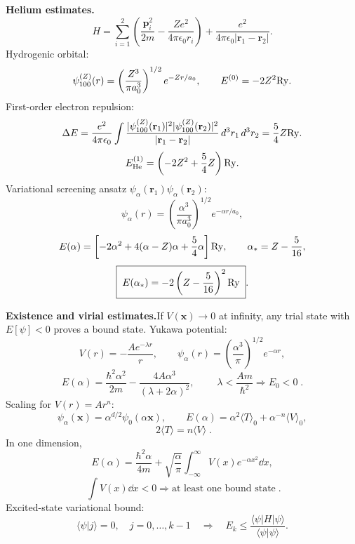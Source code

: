 \noindent\textbf{Helium estimates.}\quad
\[
H=\sum_{i=1}^2\left(\frac{\mathbf p_i^2}{2m}
-\frac{Ze^2}{4\pi\epsilon_0r_i}\right)
+\frac{e^2}{4\pi\epsilon_0|\mathbf r_1-\mathbf r_2|}.
\]
Hydrogenic orbital:
\[
\psi_{100}^{(Z)}(r)=\left(\frac{Z^3}{\pi a_0^3}\right)^{1/2}e^{-Zr/a_0},
\qquad E^{(0)}=-2Z^2{\rm Ry}.
\]
First-order electron repulsion:
\[
\Delta E=\frac{e^2}{4\pi\epsilon_0}
\int\frac{|\psi_{100}^{(Z)}(\mathbf r_1)|^2
|\psi_{100}^{(Z)}(\mathbf r_2)|^2}
{|\mathbf r_1-\mathbf r_2|}\,d^3r_1\,d^3r_2
=\frac54Z{\rm Ry}.
\]
\[
E_{\rm He}^{(1)}=\left(-2Z^2+\frac54Z\right){\rm Ry}.
\]
Variational screening ansatz $\psi_\alpha(\mathbf r_1)\psi_\alpha(\mathbf r_2)$:
\[
\psi_\alpha(r)=\left(\frac{\alpha^3}{\pi a_0^3}\right)^{1/2}e^{-\alpha r/a_0},
\]
\[
E(\alpha)=\left[-2\alpha^2+4(\alpha-Z)\alpha+\frac54\alpha\right]{\rm Ry},
\qquad
\alpha_*=Z-\frac5{16},
\]
\[
\boxed{\;E(\alpha_*)=-2\left(Z-\frac5{16}\right)^2{\rm Ry}\;}.
\]

\noindent\textbf{Existence and virial estimates.}\quad If $V(\mathbf x)\to0$
at infinity, any trial state with $E[\psi]<0$ proves a bound state. Yukawa potential:
\[
V(r)=-\frac{Ae^{-\lambda r}}{r},\qquad
\psi_\alpha(r)=\left(\frac{\alpha^3}{\pi}\right)^{1/2}e^{-\alpha r},
\]
\[
E(\alpha)=\frac{\hbar^2\alpha^2}{2m}
-\frac{4A\alpha^3}{(\lambda+2\alpha)^2},\qquad
\boxed{\;\lambda<\frac{Am}{\hbar^2}\Longrightarrow E_0<0\;}.
\]
Scaling for $V(r)=Ar^n$:
\[
\psi_\alpha(\mathbf x)=\alpha^{d/2}\psi_0(\alpha\mathbf x),\qquad
E(\alpha)=\alpha^2\langle T\rangle_0+\alpha^{-n}\langle V\rangle_0,
\]
\[
\boxed{\;2\langle T\rangle=n\langle V\rangle\;}.
\]
In one dimension,
\[
E(\alpha)=\frac{\hbar^2\alpha}{4m}
+\sqrt{\frac{\alpha}{\pi}}\int_{-\infty}^{\infty}V(x)e^{-\alpha x^2}\dd x,
\]
\[
\boxed{\;\int V(x)\dd x<0\Longrightarrow \text{at least one bound state}\;}.
\]
Excited-state variational bound:
\[
\langle\psi|j\rangle=0,\quad j=0,\ldots,k-1
\quad\Longrightarrow\quad
E_k\le\frac{\langle\psi|H|\psi\rangle}{\langle\psi|\psi\rangle}.
\]

